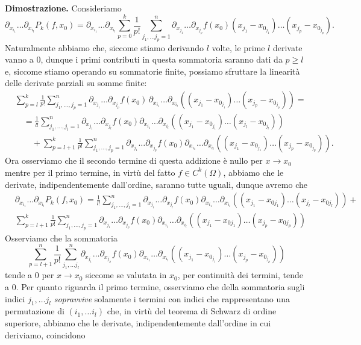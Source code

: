 \noindent \textbf{Dimostrazione. }
Consideriamo
$$
\partial_{x_{i_1}} \ldots \partial_{x_{i_l}} P_k(f, x_0) = \partial_{x_{i_1}} \ldots \partial_{x_{i_l}} \sum_{p=0}^{k} \frac{1}{p!} \sum_{j_1, \ldots j_p = 1}^n \partial_{x_{j_1}} \ldots \partial_{x_{j_p}} f(x_0)(x_{j_1} - x_{0_{j_1}}) \ldots (x_{j_p} - x_{0_{j_p}}).
$$
Naturalmente abbiamo che, siccome stiamo derivando $l$ volte, le prime $l$ derivate vanno a $0$, dunque i primi contributi in questa sommatoria saranno dati da $p \geq l$ e, siccome stiamo operando su sommatorie finite, possiamo sfruttare la linearità delle derivate parziali su somme finite:
\[\begin{aligned}
&\sum_{p=l}^k \frac{1}{p!} \sum_{j_1, \ldots, j_p = 1}^n \partial_{x_{j_1}} \ldots \partial_{x_{j_p}} f(x_0) \, \partial_{x_{i_1}} \ldots \partial_{x_{i_l}} \left( (x_{j_1} - x_{0_{j_1}}) \ldots (x_{j_p} - x_{0_{j_p}}) \right) = \\
&\quad = \frac{1}{l!} \sum_{j_1, \ldots, j_l = 1}^n \partial_{x_{j_1}} \ldots \partial_{x_{j_l}} f(x_0) \partial_{x_{i_1}} \ldots \partial_{x_{i_l}} \left( (x_{j_1} - x_{0_{j_1}}) \ldots (x_{j_l} - x_{0_{j_l}}) \right) \\
&\quad\quad + \sum_{p=l+1}^k \frac{1}{p!} \sum_{j_1, \ldots, j_p = 1}^n \partial_{x_{j_1}} \ldots \partial_{x_{j_p}} f(x_0) \partial_{x_{i_1}} \ldots \partial_{x_{i_l}} \left( (x_{j_1} - x_{0_{j_1}}) \ldots (x_{j_p} - x_{0_{j_p}}) \right).
\end{aligned}\]
Ora osserviamo che il secondo termine di questa addizione è nullo per $x \to x_0$ mentre per il primo termine, in virtù del fatto $f \in C^k (\Omega)$, abbiamo che le derivate, indipendentemente dall'ordine, saranno tutte uguali, dunque avremo che
\[\begin{aligned}
&\partial_{x_{i_1}} \ldots \partial_{x_{i_l}} P_k(f, x_0) = \frac{1}{l!} \sum_{j_1, \ldots, j_l = 1}^n \partial_{x_{j_1}} \ldots \partial_{x_{j_l}} f(x_0) \partial_{x_{i_1}} \ldots \partial_{x_{i_l}} \left( (x_{j_1} - x_{0j_1}) \ldots (x_{j_l} - x_{0j_l}) \right) + \\
&\sum_{p=l+1}^k \frac{1}{p!} \sum_{j_1, \ldots, j_p = 1}^n \partial_{x_{j_1}} \ldots \partial_{x_{j_p}} f(x_0) \partial_{x_{i_1}} \ldots \partial_{x_{i_l}} \left( (x_{j_1} - x_{0j_1}) \ldots (x_{j_p} - x_{0j_p}) \right)
\end{aligned}\]
Osserviamo che la sommatoria $$\sum\limits_{p=l+1}^n \frac{1}{p!} \sum\limits_{j_1, \ldots j_l}^n \partial_{x_{j_1}} \ldots \partial_{x_{j_p}} f(x_0) \partial_{x_{i_1}} \ldots \partial_{x_{i_l}} \left( (x_{j_1} - x_{0_{j_1}}) \ldots (x_{j_p} - x_{0_{j_p}}) \right)$$ tende a $0$ per $x \to x_0$ siccome se valutata in $x_0$, per continuità dei termini, tende a $0$. Per quanto riguarda il primo termine, osserviamo che della sommatoria sugli indici $j_1, \ldots j_l$ \emph{sopravvive} solamente i termini con indici che rappresentano una permutazione di $(i_1, \ldots i_l)$ che, in virtù del teorema di Schwarz di ordine superiore, abbiamo che le derivate, indipendentemente dall'ordine in cui deriviamo, coincidono
